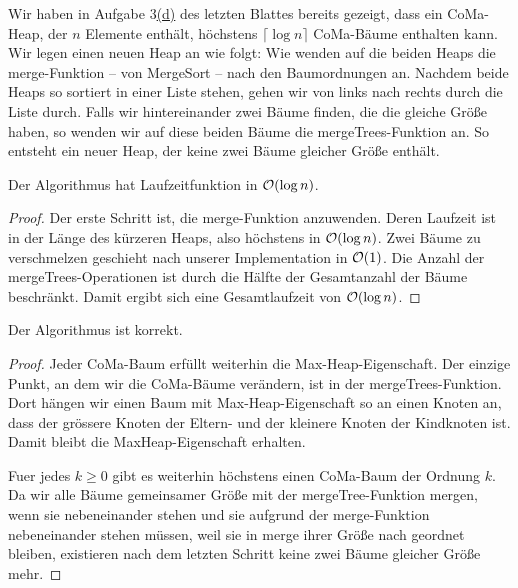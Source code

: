 \documentclass{scrartcl} %
\begin{document}
\begin{aufgabe}
\begin{enumerate}[label=(\alph*)]
            Wir haben in Aufgabe \href{https://www.youtube.com/watch?v=dQw4w9WgXcQ}{$3$(d)} des letzten Blattes bereits gezeigt, dass ein CoMa-Heap, der $n$ Elemente enthält, höchstens $\lceil \log n\rceil$ CoMa-Bäume enthalten kann. Wir legen einen neuen Heap an wie folgt: Wie wenden auf die beiden Heaps die {\ttfamily merge}-Funktion -- von MergeSort -- nach den Baumordnungen an. Nachdem beide Heaps so sortiert in einer Liste stehen, gehen wir von links nach rechts durch die Liste durch. Falls wir hintereinander zwei Bäume finden, die die gleiche Größe haben, so wenden wir auf diese beiden Bäume die {\ttfamily mergeTrees}-Funktion an. So entsteht ein neuer Heap, der keine zwei Bäume gleicher Größe enthält.
            \begin{theorem*}
                Der Algorithmus hat Laufzeitfunktion in $\operatorname{\mathcal{O}}(\log n)$.
            \end{theorem*}
            \begin{proof}
            Der erste Schritt ist, die {\ttfamily merge}-Funktion anzuwenden. Deren Laufzeit ist in der Länge des kürzeren Heaps, also höchstens in $\operatorname{\mathcal{O}}(\log n)$. Zwei Bäume zu verschmelzen geschieht nach unserer Implementation in $\operatorname{\mathcal{O}}(1)$. Die Anzahl der {\ttfamily mergeTrees}-Operationen ist durch die Hälfte der Gesamtanzahl der Bäume beschränkt. Damit ergibt sich eine Gesamtlaufzeit von $\operatorname{\mathcal{O}}(\log n)$.
            \end{proof}
            \begin{theorem*}
                Der Algorithmus ist korrekt.
            \end{theorem*}
            \begin{proof}
                Jeder CoMa-Baum erfüllt weiterhin die Max-Heap-Eigenschaft. Der einzige Punkt, an dem wir die CoMa-Bäume verändern, ist in der {\ttfamily mergeTrees}-Funktion. Dort hängen wir einen Baum mit Max-Heap-Eigenschaft so an einen Knoten an, dass der grössere Knoten der Eltern- und der kleinere Knoten der Kindknoten ist. Damit bleibt die MaxHeap-Eigenschaft erhalten.

                Fuer jedes $k\geq 0$ gibt es weiterhin höchstens einen CoMa-Baum der Ordnung $k$. Da wir alle Bäume gemeinsamer Größe mit der {\ttfamily mergeTree}-Funktion mergen, wenn sie nebeneinander stehen und sie aufgrund der {\ttfamily merge}-Funktion nebeneinander stehen müssen, weil sie in {\ttfamily merge} ihrer Größe nach geordnet bleiben, existieren nach dem letzten Schritt keine zwei Bäume gleicher Größe mehr.


\end{proof}
\end{enumerate}
\end{aufgabe}
\end{document}
